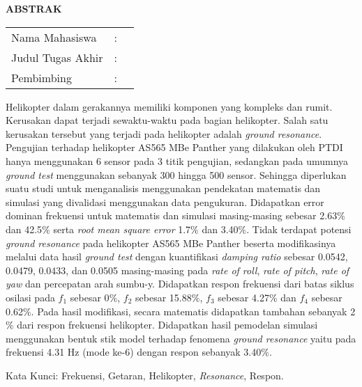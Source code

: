 \thispagestyle{newchap}
\begin{center}
  \large\textbf{ABSTRAK}
\end{center}


\vspace{2ex}

\begingroup
\setlength{\tabcolsep}{0pt}

\noindent
\begin{tabularx}{\textwidth}{l >{\centering}m{2em} X}
  Nama Mahasiswa    & : & \name{}         \\

  Judul Tugas Akhir & : & \tatitle{}      \\

  Pembimbing        & : & \advisor{}   \\
  
\end{tabularx}
\endgroup

Helikopter dalam gerakannya memiliki komponen yang kompleks dan rumit. Kerusakan dapat terjadi sewaktu-waktu pada bagian helikopter. Salah satu kerusakan tersebut yang terjadi pada helikopter adalah \textit{ground resonance}. Pengujian terhadap helikopter AS565 MBe Panther yang dilakukan oleh PTDI hanya menggunakan 6 sensor pada 3 titik pengujian, sedangkan pada umumnya \textit{ground test} menggunakan sebanyak 300 hingga 500 sensor. Sehingga diperlukan suatu studi untuk menganalisis menggunakan pendekatan matematis dan simulasi yang divalidasi menggunakan data pengukuran. Didapatkan error dominan frekuensi untuk matematis dan simulasi masing-masing sebesar 2.63$\%$ dan 42.5$\%$ serta \textit{root mean square error} 1.7$\%$ dan 3.40$\%$. Tidak terdapat potensi \textit{ground resonance} pada helikopter AS565 MBe Panther beserta modifikasinya melalui data hasil \textit{ground test} dengan kuantifikasi \textit{damping ratio} sebesar 0.0542, 0.0479, 0.0433, dan 0.0505 masing-masing pada \textit{rate of roll}, \textit{rate of pitch}, \textit{rate of yaw} dan percepatan arah sumbu-y. Didapatkan respon frekuensi dari batas siklus osilasi pada $f_1$ sebesar 0$\%$, $f_2$ sebesar 15.88$\%$, $f_3$ sebesar 4.27$\%$ dan $f_4$ sebesar 0.62$\%$. Pada hasil modifikasi, secara matematis didapatkan tambahan sebanyak 2$\%$ dari respon frekuensi helikopter. Didapatkan hasil pemodelan simulasi menggunakan bentuk stik model terhadap fenomena \textit{ground resonance} yaitu pada frekuensi 4.31 Hz (mode ke-6) dengan respon sebanyak 3.40$\%$.

Kata Kunci: Frekuensi, Getaran, Helikopter, \textit{Resonance}, Respon.